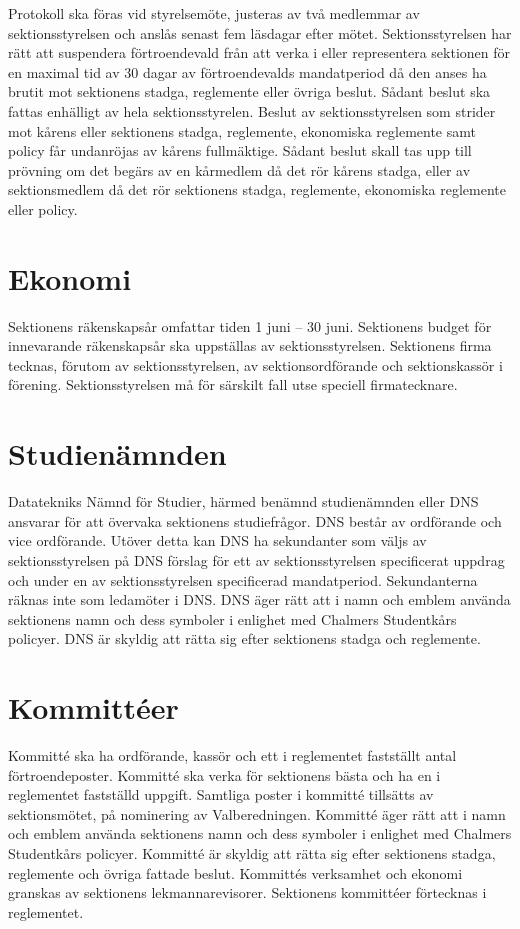 \documentclass[a4paper]{dteklag}
\begin{document}
\para Protokoll ska föras vid styrelsemöte, justeras av två medlemmar av sektionsstyrelsen och anslås senast fem läsdagar efter mötet.
 Sektionsstyrelsen har rätt att suspendera förtroendevald från att verka i eller representera sektionen för en maximal tid av 30 dagar av förtroendevalds mandatperiod då den anses ha brutit mot sektionens stadga, reglemente eller övriga beslut.
\stycke Sådant beslut ska fattas enhälligt av hela sektionsstyrelen.
\para[Överklagande] Beslut av sektionsstyrelsen som strider mot kårens eller sektionens stadga, reglemente, ekonomiska reglemente samt policy får undanröjas av kårens fullmäktige.
\stycke Sådant beslut skall tas upp till prövning om det begärs av en kårmedlem då det rör kårens stadga, eller av sektionsmedlem då det rör sektionens stadga, reglemente, ekonomiska reglemente eller policy.

\section{Ekonomi}
\para[Räkenskapsår]
Sektionens räkenskapsår omfattar tiden 1 juni – 30 juni.
\para[Budget] Sektionens budget för innevarande räkenskapsår ska uppställas av sektionsstyrelsen.
\para[Firmateckning] Sektionens firma tecknas, förutom av sektionsstyrelsen, av sektionsordförande och sektionskassör i förening.
\stycke Sektionsstyrelsen må för särskilt fall utse speciell firmatecknare.

\section{Studienämnden}
\para Datatekniks Nämnd för Studier, härmed benämnd studienämnden eller DNS ansvarar för att övervaka sektionens studiefrågor.
\para DNS består av ordförande och vice ordförande.
\stycke Utöver detta kan DNS ha sekundanter som
väljs av sektionsstyrelsen på DNS förslag för ett av sektionsstyrelsen specificerat uppdrag och under en av sektionsstyrelsen specificerad mandatperiod.
\stycke Sekundanterna räknas inte som ledamöter i DNS.
\para DNS äger rätt att i namn och emblem använda sektionens namn och dess symboler i enlighet med Chalmers Studentkårs policyer.
\para DNS är skyldig att rätta sig efter sektionens stadga och reglemente.

\section{Kommittéer}
\para Kommitté ska ha ordförande, kassör och ett i reglementet fastställt antal förtroendeposter.
\para Kommitté ska verka för sektionens bästa och ha en i reglementet fastställd uppgift.
\para Samtliga poster i kommitté tillsätts av sektionsmötet, på nominering av Valberedningen.
\para Kommitté äger rätt att i namn och emblem använda sektionens namn och dess symboler i enlighet med Chalmers Studentkårs policyer.
\para Kommitté är skyldig att rätta sig efter sektionens stadga, reglemente och övriga fattade beslut.
\para Kommittés verksamhet och ekonomi granskas av sektionens lekmannarevisorer.
\para Sektionens kommittéer förtecknas i reglementet.
\end{document}
